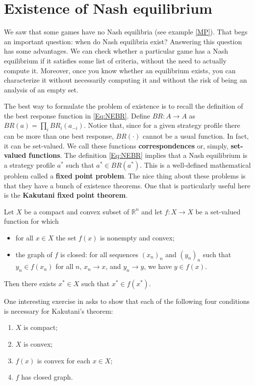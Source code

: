 \documentclass[../../main.tex]{subfiles}
\begin{document}
    \section{Existence of Nash equilibrium}
    We saw that some games have no Nash equilibria (see example \ref{MP}). That begs an important question: when do Nash equilibria exist? Answering this question has some advantages. We can check whether a particular game has a Nash equilibrium if it satisfies some list of criteria, without the need to actually compute it. Moreover, once you know whether an equilibrium exists, you can characterize it without necessarily computing it and without the risk of being an analysis of an empty set.

    The best way to formulate the problem of existence is to recall the definition of the best response function in \eqref{Eq:NEBR}. Define $BR\colon A\to A$ as $BR(a) = \prod_iBR_i(a_{-i})$. Notice that, since for a given strategy profile there can be more than one best response, $BR(\cdot)$ cannot be a usual function. In fact, it can be set-valued. We call these functions \textbf{correspondences} or, simply, \textbf{set-valued functions}. The definition \eqref{Eq:NEBR} implies that a Nash equilibrium is a strategy profile $a^*$ such that $a^*\in BR(a^*)$. This is a well-defined mathematical problem called a \textbf{fixed point problem}. The nice thing about these problems is that they have a bunch of existence theorems. One that is particularly useful here is the \textbf{Kakutani fixed point theorem}.

    \begin{mylem}
        Let $X$ be a compact and convex subset of $\mathbb{R}^n$ and let $f\colon X\to X$ be a set-valued function for which
        \begin{itemize}
            \item for all $x\in X$ the set $f(x)$ is nonempty and convex;
            \item the graph of $f$ is closed: for all sequences $(x_n)_n$ and $(y_n)_n$ such that $y_n\in f(x_n)$ for all $n$, $x_n\to x$, and $y_n\to y$, we have $y\in f(x)$.
        \end{itemize}
        Then there exists $x^*\in X$ such that $x^*\in f(x^*)$.
    \end{mylem}
    
    One interesting exercise in \cite{OR} asks to show that each of the following four conditions is necessary for Kakutani's theorem:
    \begin{enumerate}
        \item $X$ is compact;
        \item $X$ is convex;
        \item $f(x)$ is convex for each $x\in X$;
        \item $f$ has closed graph.
    \end{enumerate}
\end{document}
